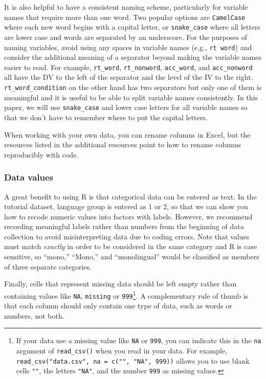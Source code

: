 \documentclass[
  english,
  doc,floatsintext]{apa6}
\begin{document}
It is also helpful to have a consistent naming scheme, particularly for variable names that require more than one word. Two popular options are \texttt{CamelCase} where each new word begins with a capital letter, or \texttt{snake\_case} where all letters are lower case and words are separated by an underscore. For the purposes of naming variables, avoid using any spaces in variable names (e.g., \texttt{rt\ word}) and consider the additional meaning of a separator beyond making the variable names easier to read. For example, \texttt{rt\_word}, \texttt{rt\_nonword}, \texttt{acc\_word}, and \texttt{acc\_nonword} all have the DV to the left of the separator and the level of the IV to the right. \texttt{rt\_word\_condition} on the other hand has two separators but only one of them is meaningful and it is useful to be able to split variable names consistently. In this paper, we will use \texttt{snake\_case} and lower case letters for all variable names so that we don't have to remember where to put the capital letters.

When working with your own data, you can rename columns in Excel, but the resources listed in the additional resources point to how to rename columns reproducibly with code.

\hypertarget{data-values}{%
\subsubsection{Data values}\label{data-values}}

A great benefit to using R is that categorical data can be entered as text. In the tutorial dataset, language group is entered as 1 or 2, so that we can show you how to recode numeric values into factors with labels. However, we recommend recording meaningful labels rather than numbers from the beginning of data collection to avoid misinterpreting data due to coding errors. Note that values must match \emph{exactly} in order to be considered in the same category and R is case sensitive, so ``mono,'' ``Mono,'' and ``monolingual'' would be classified as members of three separate categories.

Finally, cells that represent missing data should be left empty rather than containing values like \texttt{NA}, \texttt{missing} or \texttt{999}\footnote{If your data use a missing value like \texttt{NA} or \texttt{999}, you can indicate this in the \texttt{na} argument of \texttt{read\_csv()} when you read in your data. For example, \texttt{read\_csv("data.csv",\ na\ =\ c("",\ "NA",\ 999))} allows you to use blank cells \texttt{""}, the letters \texttt{"NA"}, and the number \texttt{999} as missing values.}. A complementary rule of thumb is that each column should only contain one type of data, such as words or numbers, not both.
\end{document}

